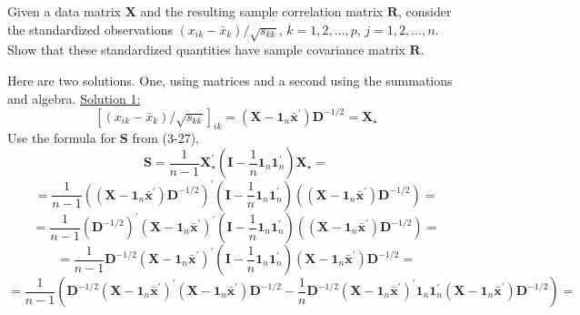 Given a data matrix $\textbf{X}$ and the resulting sample correlation matrix $\textbf{R}$,
consider the standardized observations $(x_{ik} - \bar{x}_{k})/\sqrt{s_{kk}}$, $k=1,2,\dots,p$,
$j=1,2,\dots,n$. Show that these standardized quantities have sample covariance
matrix $\textbf{R}$.
\newline
\par
Here are two solutions. One, using matrices and a second using the summations and algebra.
\newline
\underline{Solution 1:}
\[
    {[(x_{ik} - \bar{x}_{k})/\sqrt{s_{kk}}]}_{ik}
    =
    \left(\textbf{X} - \textbf{1}_{n}{\bar{\textbf{x}}}^{\prime}\right)\textbf{D}^{-1/2}
    =
    \textbf{X}_{\star}
\]
Use the formula for $\textbf{S}$ from (3-27),
\[
    \textbf{S}
    =
    \frac{1}{n-1}
    \textbf{X}_{\star}^{\prime}
    {\left(
        \textbf{I}
        -
        \frac{1}{n}
        \textbf{1}_{n}
        \textbf{1}_{n}^{\prime}
    \right)}
    \textbf{X}_{\star}
    =
\]
\[
    =
    \frac{1}{n-1}
    {\left(
        \left(\textbf{X} - \textbf{1}_{n}{\bar{\textbf{x}}}^{\prime}\right)\textbf{D}^{-1/2}
    \right)}^{\prime}
    {\left(
        \textbf{I}
        -
        \frac{1}{n}
        \textbf{1}_{n}
        \textbf{1}_{n}^{\prime}
    \right)}
    {\left(
        \left(\textbf{X} - \textbf{1}_{n}{\bar{\textbf{x}}}^{\prime}\right)\textbf{D}^{-1/2}
    \right)}
    =
\]
\[
    =
    \frac{1}{n-1}
    {\left(\textbf{D}^{-1/2}\right)}^{\prime}
    {\left(\textbf{X} - \textbf{1}_{n}{\bar{\textbf{x}}}^{\prime}\right)}^{\prime}
    {\left(
        \textbf{I}
        -
        \frac{1}{n}
        \textbf{1}_{n}
        \textbf{1}_{n}^{\prime}
    \right)}
    {\left(
        \left(\textbf{X} - \textbf{1}_{n}{\bar{\textbf{x}}}^{\prime}\right)\textbf{D}^{-1/2}
    \right)}
    =
\]
\[
    =
    \frac{1}{n-1}
    \textbf{D}^{-1/2}
    {\left(\textbf{X} - \textbf{1}_{n}{\bar{\textbf{x}}}^{\prime}\right)}^{\prime}
    {\left(
        \textbf{I}
        -
        \frac{1}{n}
        \textbf{1}_{n}
        \textbf{1}_{n}^{\prime}
    \right)}
    \left(\textbf{X} - \textbf{1}_{n}{\bar{\textbf{x}}}^{\prime}\right)\textbf{D}^{-1/2}
    =
\]
\[
    =
    \frac{1}{n-1}
    {\left(
        \textbf{D}^{-1/2}
        {\left(\textbf{X} - \textbf{1}_{n}{\bar{\textbf{x}}}^{\prime}\right)}^{\prime}
        \left(\textbf{X} - \textbf{1}_{n}{\bar{\textbf{x}}}^{\prime}\right)\textbf{D}^{-1/2}
        -
        \frac{1}{n}
        \textbf{D}^{-1/2}
        {\left(\textbf{X} - \textbf{1}_{n}{\bar{\textbf{x}}}^{\prime}\right)}^{\prime}
        \textbf{1}_{n}
        \textbf{1}_{n}^{\prime}
        \left(\textbf{X} - \textbf{1}_{n}{\bar{\textbf{x}}}^{\prime}\right)\textbf{D}^{-1/2}
    \right)}
    =
\]
